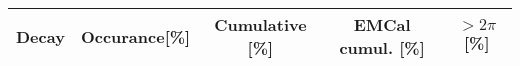 \begin{center}\setlength{\tabcolsep}{3mm}\centering\begin{longtable}{l | c | c | c | c} Decay & Occurance[\%] & Cumulative [\%] & EMCal cumul. [\%] & $>2\pi$ [\%] \\ \hline \hline
\end{longtable}\end{center}
